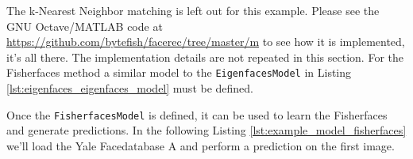 \ifx\python\undefined
	The k-Nearest Neighbor matching is left out for this example. Please see the GNU Octave/MATLAB code at \url{https://github.com/bytefish/facerec/tree/master/m} to see how it is implemented, it's all there.
\else
	The implementation details are not repeated in this section. For the Fisherfaces method a similar model to the \lstinline|EigenfacesModel| in Listing \ref{lst:eigenfaces_eigenfaces_model} must be defined.
		
	
	
		Once the \lstinline|FisherfacesModel| is defined, it can be used to learn the Fisherfaces and generate predictions. In the following Listing \ref{lst:example_model_fisherfaces} we'll load the Yale Facedatabase A and perform a prediction on the first image.
		
	

\fi
